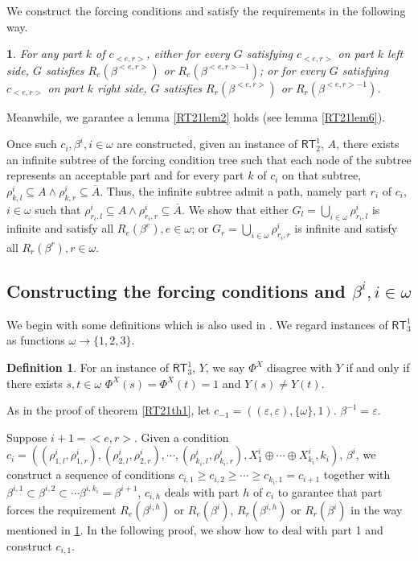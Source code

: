 \documentclass[options]{amsart}
\newtheorem{emphasise}[theorem]{ }
\theoremstyle{definition}
\newtheorem{definition}[theorem]{Definition}
\theoremstyle{remark}
\newtheorem{Ramsey's theorem}[theorem]{Ramsey's theorem}
\begin{document}
We construct the forcing conditions
 and satisfy the requirements in the
following way.
\begin{emphasise}\label{RT21emph1}
For any part $k$ of $c_{<e,r>}$,
either
for every $G $ satisfying $c_{<e,r>}$ on
part $k$ left side, $G$ satisfies
$R_e(\beta^{<e,r>})$ or $R_e(\beta^{<e,r>-1})$;
or
for every $G$ satisfying $c_{<e,r>}$
on part $k$ right side,
$G$ satisfies $R_r(\beta^{<e,r>})$
or $R_r(\beta^{<e,r>-1})$.
\end{emphasise}

Meanwhile, we garantee a lemma \ref{RT21lem2}
holds (see lemma \ref{RT21lem6}).

Once such $c_i, \beta^i, i\in\omega$
are constructed,
given an
instance of $\mathsf{RT}_2^1$, $A$,
there exists an infinite subtree of
the forcing condition tree such that
each node of the subtree represents  an
acceptable part and for every
part $k$ of $c_i$ on that subtree,
$\rho^i_{k,l}\subseteq A\wedge
\rho^i_{k,r}\subseteq \overline{A}$.
Thus, the infinite subtree admit a
path, namely part $r_i$ of $c_i$, $i\in\omega$
such that $\rho^i_{r_i,l}\subseteq
A\wedge \rho^i_{r_i,r}\subseteq\overline{A}$.
We show that either
$G_l=\bigcup\limits_{i\in\omega}
\rho^i_{r_i,l}$ is infinite and
satisfy all $R_e(\beta^e), e\in\omega$; or
$G_r=\bigcup\limits_{i\in\omega}
\rho^i_{r_i,r}$ is infinite
and satisfy all $R_r(\beta^r),r\in\omega$.

\subsection{Constructing the forcing
conditions and $\beta^i,i\in\omega$}

We begin with some definitions
which is also used in \cite{liu2015cone}
\cite{liu2015construct}.
We regard instances of $\mathsf{RT}_3^1$
as functions $\omega\rightarrow \{1,2,3\}$.
\begin{definition}
For an instance of $\mathsf{RT}_3^1$,
$Y$, we say $\Phi^X$ disagree with
$Y$ if and only if there exists
$s,t\in\omega$ $\Phi^X(s)=
\Phi^X(t) = 1$ and
$Y(s)\neq Y(t)$.

\end{definition}

As in the proof of theorem \ref{RT21th1},
let $c_{-1}=( (\varepsilon,\varepsilon), \{\omega\},1)$.
$\beta^{-1}=\varepsilon$.

 Suppose
$i+1=<e,r>$.
Given a condition $c_i=
((\rho^i_{1,l},\rho^i_{1,r})
,(\rho^i_{2,l},\rho^i_{2,r}),
\cdots,(\rho^i_{k_i,l},\rho^i_{k_i,r}),
X^i_1\oplus\cdots\oplus X^i_{k_i}, k_i)$, $\beta^i$,
we construct
a sequence of conditions $c_{i,1}
\geq c_{i,2}\geq \cdots \geq c_{k_i,1}=
c_{i+1}$ together with
$\beta^{i,1}\subset\beta^{i,2}\subset\cdots
\beta^{i,k_i}=\beta^{i+1}$,
 $c_{i,h}$ deals with
part $h$ of $c_{i}$ to garantee
that
 part forces the requirement
$R_e(\beta^{i,h})$ or
$R_e(\beta^{i})$, $R_r(\beta^{i,h})$ 
or $R_r(\beta^{i})$ in the
way mentioned in
\ref{RT21emph1}.
In the following proof, we show how to 
deal with part 1 and construct $c_{i,1}$.
\end{document}
